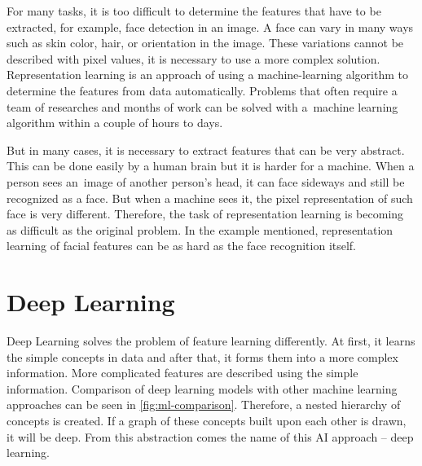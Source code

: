 For many tasks, it is too difficult to determine the features that have to be extracted, for example, face detection in an image. A face can vary in many ways such as skin color, hair, or orientation in the image. These variations cannot be described with pixel values, it is necessary to use a more complex solution. Representation learning is an approach of using a machine-learning algorithm to determine the features from data automatically. Problems that often require a team of researches and months of work can be solved with a~machine learning algorithm within a couple of hours to days. 

But in many cases, it is necessary to extract features that can be very abstract. This can be done easily by a human brain but it is harder for a machine. When a person sees an~image of another person's head, it can face sideways and still be recognized as a face. But when a machine sees it, the pixel representation of such face is very different. Therefore, the task of representation learning is becoming as difficult as the original problem. In the example mentioned, representation learning of facial features can be as hard as the face recognition itself.

\section{\label{sec:deep-learning}Deep Learning}
Deep Learning solves the problem of feature learning differently. At first, it learns the simple concepts in data and after that, it forms them into a more complex information. More complicated features are described using the simple information. Comparison of deep learning models with other machine learning approaches can be seen in \autoref{fig:ml-comparison}. Therefore, a nested hierarchy of concepts is created. If a graph of these concepts built upon each other is drawn, it will be deep. From this abstraction comes the name of this AI approach – deep learning.

